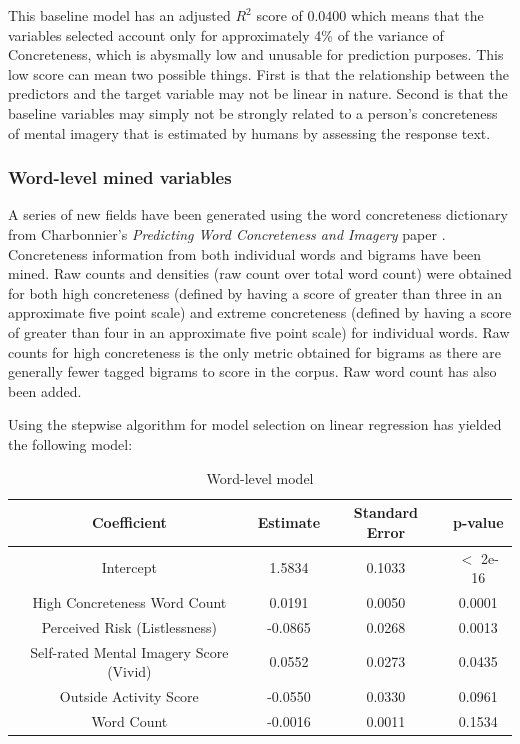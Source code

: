 \documentclass[12pt, a4paper]{article}
\begin{document}
This baseline model has an adjusted $R^2$ score of $0.0400$ which means that the variables selected account only for approximately 4\% of the variance of Concreteness, which is abysmally low and unusable for prediction purposes. This low score can  mean two possible things. First is that the relationship between the predictors and the target variable may not be linear in nature. Second is that the baseline variables may simply not be strongly related to a person's concreteness of mental imagery that is estimated by humans by assessing the response text.  

\subsubsection{Word-level mined variables}
A series of new fields have been generated using the word concreteness dictionary from Charbonnier's \textit{Predicting Word Concreteness and Imagery} paper \cite{charbonnier-wartena-2019-predicting}. Concreteness information from both individual words and bigrams have been mined. Raw counts and densities (raw count over total word count) were obtained for both high concreteness (defined by having a score of greater than three in an approximate five point scale) and extreme concreteness (defined by having a score of greater than four in an approximate five point scale) for individual words. Raw counts for high concreteness is the only metric obtained for bigrams as there are generally fewer tagged bigrams to score in the corpus. Raw word count has also been added.

Using the stepwise algorithm for model selection on linear regression has yielded the following model:

\begin{table}[ht]
\centering
\begin{tabular}{||c c c c||} 
 \hline
 Coefficient & Estimate & Standard Error & p-value \\ [0.5ex] 
 \hline\hline
 Intercept & 1.5834 & 0.1033 & $<$ 2e-16 \\ 
 High Concreteness Word Count\footnotemark & 0.0191 & 0.0050 & 0.0001 \\
 Perceived Risk (Listlessness) & -0.0865 & 0.0268 & 0.0013 \\
 Self-rated Mental Imagery Score (Vivid)  & 0.0552 & 0.0273 & 0.0435 \\
 Outside Activity Score & -0.0550 & 0.0330 & 0.0961 \\ 
 Word Count  & -0.0016 & 0.0011 & 0.1534 \\ [1ex] 
 \hline
\end{tabular}
\caption{Word-level model}
\label{table:2}
\end{table}
\end{document}
